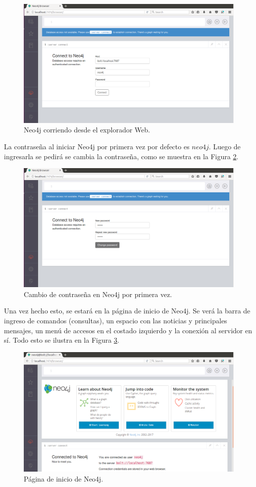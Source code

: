 \documentclass[conference]{IEEEtran}
\begin{document}
\begin{figure}[H]
\begin{center}
\includegraphics[width= 0.45 \textwidth]{web_browser1.png}
\end{center}
\caption{Neo4j corriendo desde el explorador Web.}
\label{fig13}
\end{figure}

La contraseña al iniciar Neo4j por primera vez por defecto es $neo4j$. Luego de ingresarla se pedirá se cambia la contraseña, como se muestra en la Figura \ref{fig14}.

\begin{figure}[H]
\begin{center}
\includegraphics[width= 0.45 \textwidth]{web_change_p.png}
\end{center}
\caption{Cambio de contraseña en Neo4j por primera vez.}
\label{fig14}
\end{figure}

Una vez hecho esto, se estará en la página de inicio de Neo4j. Se verá la barra de ingreso de comandos (consultas), un espacio con las noticias y principales mensajes, un menú de accesos en el costado izquierdo y la conexión al servidor en sí. Todo esto se ilustra en la Figura \ref{fig15}.

\begin{figure}[H]
\begin{center}
\includegraphics[width= 0.45 \textwidth]{inicio_neo4j.png}
\end{center}
\caption{Página de inicio de Neo4j.}
\label{fig15}
\end{figure}
\end{document}
